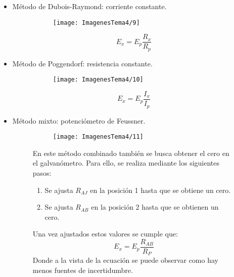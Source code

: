 \begin{itemize}
	\item Método de Dubois-Raymond: corriente constante.
\begin{figure}[H]
	\begin{minipage}{0.7\textwidth}
		\begin{figure}[H]
			\centering
			\texttt{[image: ImagenesTema4/9]}
			\label{fig:9}
		\end{figure}\textbf{}	
	\end{minipage}
	\begin{minipage}{0.2\textwidth}
		\[E_x=E_p\frac{R_x}{R_p}\]
	\end{minipage}
\end{figure}	
	\item Método de Poggendorf: resistencia constante.
	\begin{figure}[H]
		\begin{minipage}{0.7\textwidth}
			\begin{figure}[H]
				\centering
				\texttt{[image: ImagenesTema4/10]}
				\label{fig:9}
			\end{figure}\textbf{}	
		\end{minipage}
		\begin{minipage}{0.2\textwidth}
			\[E_x=E_p\frac{I_x}{I_p}\]
		\end{minipage}
	\end{figure}	
	\item Método mixto: potenciómetro de Feussner.
	\begin{figure}[H]
		\begin{minipage}{0.5\textwidth}
			\begin{figure}[H]
				\centering
				\texttt{[image: ImagenesTema4/11]}
				\label{fig:9}
			\end{figure}\textbf{}	
		\end{minipage}
		\begin{minipage}{0.5\textwidth}
			En este método combinado también se busca obtener el cero en el galvanómetro. Para ello, se realiza mediante los siguientes pasos:
			\begin{enumerate}
				\item Se ajusta $R_{AJ}$ en la posición 1 hasta que se obtiene un cero.
				\item Se ajusta $R_{AB}$ en la posición 2 hasta que se obtienen un cero.
			\end{enumerate}
			Una vez ajustados estos valores se cumple que:
			\[E_x=E_p\frac{R_{AB}}{R_P}\]
			Donde a la vista de la ecuación se puede observar como hay menos fuentes de incertidumbre.
		\end{minipage}
	\end{figure}
\end{itemize}
